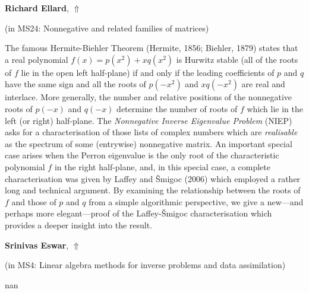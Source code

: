 \documentclass[ILAS2025-program.tex]{subfiles}
\begin{document}
     \hypertarget{down0197}{}\begin{ilasabstract}
    
    \textbf{Richard Ellard},  \hfill \hyperlink{up0197}{$\Uparrow$}
    
    (in {\color{mstitle}MS24: Nonnegative and related families of matrices})
        
        \mtskip
    The famous Hermite-Biehler Theorem (Hermite, 1856; Biehler, 1879) states that a real polynomial $f(x)=p(x^2)+xq(x^2)$ is Hurwitz stable (all of the roots of $f$ lie in the open left half-plane) if and only if the leading coefficients of $p$ and $q$ have the same sign and all the roots of $p(-x^2)$ and $xq(-x^2)$ are real and interlace. More generally, the number and relative positions of the nonnegative roots of $p(-x)$ and $q(-x)$ determine the number of roots of $f$ which lie in the left (or right) half-plane. The \emph{Nonnegative Inverse Eigenvalue Problem} (NIEP) asks for a characterisation of those lists of complex numbers which are \emph{realisable} as the spectrum of some (entrywise) nonnegative matrix. An important special case arises when the Perron eigenvalue is the only root of the characteristic polynomial $f$ in the right half-plane, and, in this special case, a complete characterisation was given by Laffey and \v{S}migoc (2006) which employed a rather long and technical argument. By examining the relationship between the roots of $f$ and those of $p$ and $q$ from a simple algorithmic perspective, we give a new---and perhaps more elegant---proof of the Laffey-\v{S}migoc characterisation which provides a deeper insight into the result.
\end{ilasabstract}
     \hypertarget{down0355}{}\begin{ilasabstract}
    
    \textbf{Srinivas Eswar},  \hfill \hyperlink{up0355}{$\Uparrow$}
    
    (in {\color{mstitle}MS4: Linear algebra methods for inverse problems and data assimilation})
        
        \mtskip
    nan\end{ilasabstract}
\end{document}
